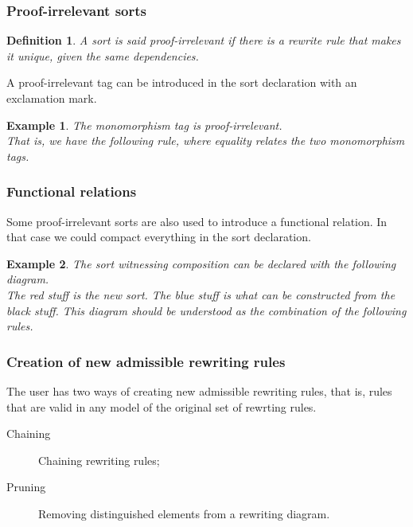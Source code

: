 \documentclass{article}
\newtheorem{example}{Example}[section]
\newtheorem{definition}{Definition}[section]
\begin{document}
\subsubsection{Proof-irrelevant sorts}
\label{sec:proof-irrelevant}
\begin{definition}
    A sort is said \emph{proof-irrelevant} if there is a rewrite rule 
    that makes it unique, given the same dependencies.        
\end{definition}
A proof-irrelevant tag can be introduced in the sort declaration 
with an exclamation mark.
\begin{example}
    The monomorphism tag is proof-irrelevant.
    \begin{equation*}
    
    \end{equation*}
    That is, we have the following rule, where equality relates the two monomorphism tags.
    \begin{equation}
    
    \label{eq:rew-mono-proof-irrelevant}
    \tag{MonoIrr}
    \end{equation}
\end{example}

\subsubsection{Functional relations}
\label{sec:functional-relations}
Some proof-irrelevant sorts are also used to 
introduce a functional relation.
In that case we could compact everything in
the sort declaration.
\begin{example}
    The sort witnessing composition can be declared 
    with the following diagram.
    \[
    
    \]
    The red stuff is the new sort.
    The blue stuff is what can be constructed from the black stuff. 
    This diagram should be understood as the combination of the following 
    rules.
    \[
    
    \]
\end{example}
\subsubsection{Creation of new admissible rewriting rules}
The user has two ways of creating new admissible rewriting rules, that is, rules that are valid in any model of the original set of rewrting rules.
\begin{description}
    \item[Chaining] Chaining rewriting rules;
    \item[Pruning] Removing distinguished elements from a rewriting diagram.
\end{description}
\end{document}
